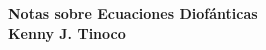 \begin{center} \textbf
{
    {\Large Notas sobre Ecuaciones Diofánticas}\\
    {\large Kenny J. Tinoco}
}
\end{center}

\thispagestyle{first-page-style}